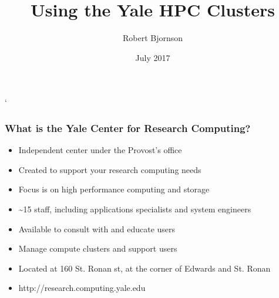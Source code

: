 \documentclass[10pt]{beamer}
\begin{document}
\title{Using the Yale HPC Clusters}`
\author{{Robert Bjornson}}
\date{July 2017}

\begin{frame}[plain]
  \titlepage
\end{frame}

\begin{frame}[fragile]
\frametitle{What is the Yale Center for Research Computing?}

\begin{itemize}
\item Independent center under the Provost's office
\item Created to support your research computing needs
\item Focus is on high performance computing and storage
\item \textasciitilde 15 staff, including applications specialists and system engineers
\item Available to consult with and educate users
\item Manage compute clusters and support users
\item Located at 160 St. Ronan st, at the corner of Edwards and St. Ronan
\item http://research.computing.yale.edu
\end{itemize}

\end{frame}
\end{document}
